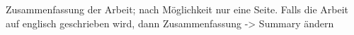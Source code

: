 \thispagestyle{empty}
Zusammenfassung der Arbeit; nach Möglichkeit nur eine Seite.
Falls die Arbeit auf englisch geschrieben wird, dann Zusammenfassung -> Summary ändern